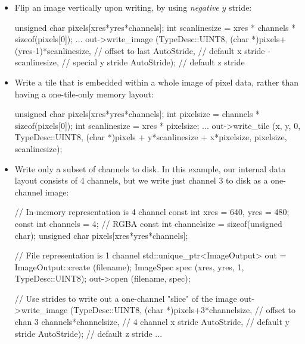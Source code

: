 \begin{itemize}
\item Flip an image vertically upon writing, by using \emph{negative}
  $y$ stride:
  \begin{code}
    unsigned char pixels[xres*yres*channels];
    int scanlinesize = xres * channels * sizeof(pixels[0]);
    ...
    out->write_image (TypeDesc::UINT8,
                      (char *)pixels+(yres-1)*scanlinesize, // offset to last
                      AutoStride,                  // default x stride
                      -scanlinesize,               // special y stride
                      AutoStride);                 // default z stride
  \end{code}
\item Write a tile that is embedded within a whole image of pixel data,
  rather than having a one-tile-only memory layout:
  \begin{code}
    unsigned char pixels[xres*yres*channels];
    int pixelsize = channels * sizeof(pixels[0]);
    int scanlinesize = xres * pixelsize;
    ...
    out->write_tile (x, y, 0, TypeDesc::UINT8,
                     (char *)pixels + y*scanlinesize + x*pixelsize,
                     pixelsize,
                     scanlinesize);
  \end{code}
\item Write only a subset of channels to disk.  In this example, our
  internal data layout consists of 4 channels, but we write just 
  channel 3 to disk as a one-channel image:
  \begin{code}
    // In-memory representation is 4 channel
    const int xres = 640, yres = 480;
    const int channels = 4;  // RGBA
    const int channelsize = sizeof(unsigned char);
    unsigned char pixels[xres*yres*channels];

    // File representation is 1 channel
    std::unique_ptr<ImageOutput> out = ImageOutput::create (filename);
    ImageSpec spec (xres, yres, 1, TypeDesc::UINT8);
    out->open (filename, spec);

    // Use strides to write out a one-channel "slice" of the image
    out->write_image (TypeDesc::UINT8,
                      (char *)pixels+3*channelsize, // offset to chan 3
                      channels*channelsize,         // 4 channel x stride
                      AutoStride,                   // default y stride
                      AutoStride);                  // default z stride
    ...
  \end{code}
\end{itemize}

